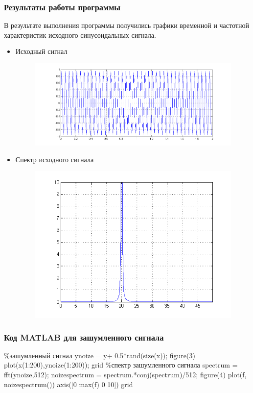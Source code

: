 \documentclass[10pt,a4paper]{article}
\begin{document}
\subsubsection{Результаты работы программы}
В результате выполнения программы получились графики временной и частотной характеристик исходного синусоидальных сигнала.
\begin{itemize}
\item Исходный сигнал
\begin{figure}[h]
\centering
\includegraphics[width=12cm]{1.png} 
\end{figure}
\item Спектр исходного сигнала
\begin{figure}[h]
\centering
\includegraphics[width=12cm]{2.png} 
\end{figure}
\end{itemize}
\FloatBarrier
\subsubsection{Код MATLAB для зашумленного сигнала}
\%зашумленный сигнал\newline
ynoize = y+ 0.5*rand(size(x));\newline
figure(3)\newline
plot(x(1:200),ynoize(1:200));\newline
grid\newline
\%спектр зашумленного сигнала\newline
spectrum = fft(ynoize,512);\newline
noizespectrum = spectrum.*conj(spectrum)/512;\newline
figure(4)\newline
plot(f, noizespectrum())\newline
axis([0 max(f) 0 10])\newline
grid\newline
\end{document}
